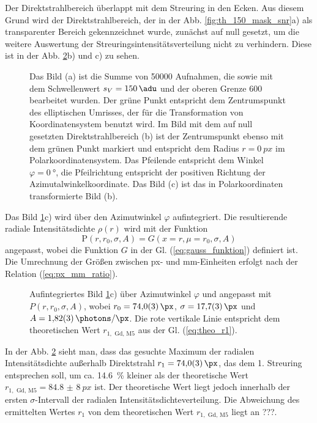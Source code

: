\noindent
Der Direktstrahlbereich überlappt mit dem Streuring in den Ecken. Aus diesem Grund wird der Direktstrahlbereich, der in der Abb. \ref{fig:th_150_mask_snr}a) als transparenter Bereich gekennzeichnet wurde, zunächst auf null gesetzt, um die weitere Auswertung der Streuringsintensitätsverteilung nicht zu verhindern. Diese ist in der Abb. \ref{fig:radius_fit}b) und c) zu sehen.
\begin{figure}[H]
    \centering
    
    \caption{Das Bild (a) ist die Summe von \num{50000} Aufnahmen, die sowie mit dem Schwellenwert $s_V = \SI{150}{\adu}$ und der oberen Grenze \SI{600}{\adu} bearbeitet wurden. Der grüne Punkt entspricht dem Zentrumspunkt des elliptischen Umrisses, der für die Transformation von Koordinatensystem benutzt wird. Im Bild mit dem auf null gesetzten Direktstrahlbereich (b) ist der Zentrumspunkt ebenso mit dem grünen Punkt markiert und entspricht dem Radius $r=\SI{0}{px}$ im Polarkoordinatensystem. Das Pfeilende entspricht dem Winkel $\varphi = \SI{0}{\degree}$, die Pfeilrichtung entspricht der positiven Richtung der Azimutalwinkelkoordinate. Das Bild (c) ist das in Polarkoordinaten transformierte Bild (b).}
    \label{fig:th-150-200-maske-radial-transform}
\end{figure}
\noindent
Das Bild \ref{fig:th-150-200-maske-radial-transform}c) wird über den Azimutwinkel $\varphi$ aufintegriert. Die resultierende radiale Intensitätsdichte $\rho(r)$ wird mit der Funktion
\begin{equation}
    \mathrm{P}(r, r_0, \sigma, A) = G(x=r,\mu=r_0,\sigma,A)
\end{equation}
angepasst, wobei die Funktion $G$ in der Gl. (\ref{eq:gauss_funktion}) definiert ist. Die Umrechnung der Größen zwischen px- und \si{\milli\meter}-Einheiten erfolgt nach der Relation (\ref{eq:px_mm_ratio}).

\begin{figure}[H]
    \centering
    
    \caption{Aufintegriertes Bild \ref{fig:th-150-200-maske-radial-transform}c) über Azimutwinkel $\varphi$ und angepasst mit $P(r, r_0, \sigma, A)$, wobei $r_0 = \SI{74.0(3)}{\px}$, $\sigma = \SI{17.7(3)}{\px}$ und $A = \SI{1.82(3)}{\photons\per\px}$. Die rote vertikale Linie entspricht dem theoretischen Wert $r_{1, \text{ Gd, M5}}$ aus der Gl. (\ref{eq:theo_r1}).}
    \label{fig:radius_fit}
\end{figure}
\noindent
In der Abb. \ref{fig:radius_fit} sieht man, dass das gesuchte Maximum der radialen Intensitätsdichte außerhalb Direktstrahl $r_1 = \SI{74.0(3)}{\px}$, das dem 1. Streuring entsprechen soll, um ca. \SI{14,6}{\percent} kleiner als der theoretische Wert $r_{1, \text{ Gd, M5}} = \SI{84,8(8)}{px}$ ist. Der theoretische Wert liegt jedoch innerhalb der ersten $\sigma$-Intervall der radialen Intensitätsdichteverteilung. Die Abweichung des ermittelten Wertes $r_1$ von dem theoretischen Wert $r_{1, \text{ Gd, M5}}$ liegt an ???.

